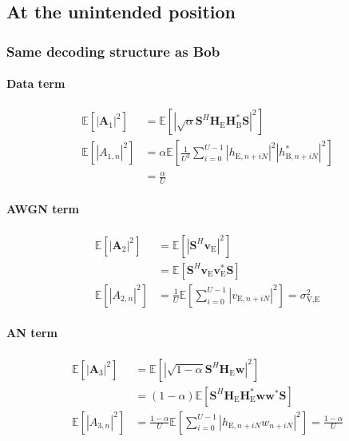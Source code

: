 \documentclass[journal,comsoc]{IEEEtran}
\newcommand{\module}[1]{\left|#1\right|}
\newcommand{\EX}[1]{\mathbb{E} \left[#1\right]}%
\newcommand{\HE}{\textbf{H}_{\text{E}}}
\newcommand{\HB}{\textbf{H}_{\text{B}}}
\newcommand{\ve}{\textbf{v}_{\text{E}}}
\newcommand{\spread}{\textbf{S}}
\newcommand{\w}{\textbf{w}}
\begin{document}
\subsection{At the unintended position}\label{sec:at-the-unintended-position-app}
\subsubsection{Same decoding structure as Bob}\label{sec:same-decoding-structure-as-bob-app}
\paragraph{Data term}\label{sec:data-term-app-1}
\begin{equation}
	\begin{split}
		\EX{|\textbf{A}_{1}|^2} &= \EX{\module{\sqrt{\alpha}\spread^H \HE\HB^* \spread}^2} \\
		\EX{|A_{1,n}|^2}&=\alpha \EX{\frac{1}{U^2} \sum_{i=0}^{U-1} \left| h_{\text{E}, n + iN} \right|^2 \left| h^*_{\text{B}, n + iN}\right|^2 } \\
		&= \frac{\alpha}{U}
	\end{split}
	\label{eq:appA:data_eve_filt0-app}
\end{equation}



\paragraph{AWGN term}\label{sec:awgn-term-app-1}
\begin{equation}
	\begin{split}
		\EX{|\textbf{A}_{2}|^2} &=  \EX{\module{\spread^H \ve}^2} \\
		&=\EX{\spread^H \ve \ve^* \spread } \\
		\EX{|A_{2,n}|^2} &= \frac{1}{U} \EX{\sum_{i=0}^{U-1} |v_{\text{E}, n + iN}|^2} = \sigma^2_{\text{V,E}}
	\end{split}
	\label{eq:appA:noise_eve_filt0-app}
\end{equation}


\paragraph{AN term}\label{sec:an-term-app-1}
\begin{equation}
	\begin{split}
		\EX{|\textbf{A}_{3}|^2} &=  \EX{\module{\sqrt{1-\alpha}\spread^H \HE \w}^2} \\
		&=(1-\alpha)\EX{\spread^H \HE\textbf{H}^*_{\text{E}} \w\w^* \spread } \\
		\EX{|A_{3,n}|^2}  &= \frac{1-\alpha}{U} \EX{\sum_{i=0}^{U-1} |h_{\text{E}, n + iN}w_{n + iN}|^2} = \frac{1-\alpha}{U}
	\end{split}
	\label{eq:appA:an_eve_filt0-app}
\end{equation}
\end{document}
